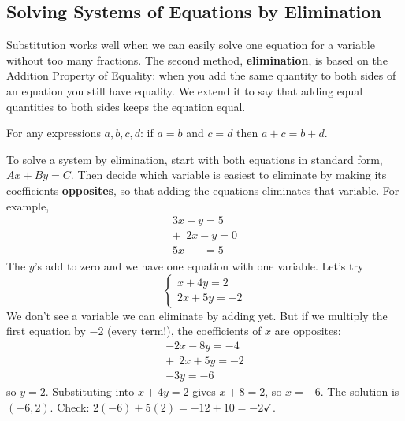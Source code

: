 \documentclass[letter]{article}
\begin{document}
\subsection{Solving Systems of Equations by Elimination}

Substitution works well when we can easily solve one equation for a variable without too many fractions. The second method, \textbf{elimination}, is based on the Addition Property of Equality: when you add the same quantity to both sides of an equation you still have equality. We extend it to say that adding equal quantities to both sides keeps the equation equal.

\begin{center}
For any expressions $a,b,c,d$: if $a=b$ and $c=d$ then $a+c=b+d$.
\end{center}

To solve a system by elimination, start with both equations in standard form, $Ax+By=C$. Then decide which variable is easiest to eliminate by making its coefficients \textbf{opposites}, so that adding the equations eliminates that variable. For example,
\[
\begin{array}{r}3x+y=5\\+\ \ 2x-y=0\\\hline5x\phantom{{}+y}=5\end{array}
\]
The $y$'s add to zero and we have one equation with one variable. Let's try
\[\begin{cases}x+4y=2\\2x+5y=-2\end{cases}\]
We don't see a variable we can eliminate by adding yet. But if we multiply the first equation by $-2$ (every term!), the coefficients of $x$ are opposites:
\[\begin{array}{r}-2x-8y=-4\\+\ \ 2x+5y=-2\\\hline-3y=-6\end{array}\]
so $y=2$. Substituting into $x+4y=2$ gives $x+8=2$, so $x=-6$. The solution is $(-6,2)$. Check: $2(-6)+5(2)=-12+10=-2\checkmark$.
\end{document}
